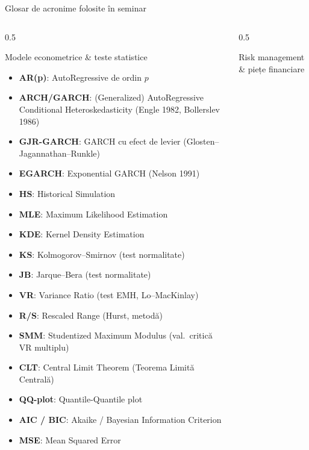 \documentclass[9pt, aspectratio=169, t]{beamer}
\begin{document}
\begin{frame}[shrink=40]{Glosar de acronime folosite în seminar}
\begin{columns}[T]
\begin{column}{0.5\textwidth}
\footnotesize
\begin{block}{Modele econometrice \& teste statistice}
\begin{itemize}\setlength{\itemsep}{1pt}
    \item \textbf{AR(p)}: AutoRegressive de ordin $p$
    \item \textbf{ARCH/GARCH}: (Generalized) AutoRegressive Conditional Heteroskedasticity (Engle 1982, Bollerslev 1986)
    \item \textbf{GJR-GARCH}: GARCH cu efect de levier (Glosten--Jagannathan--Runkle)
    \item \textbf{EGARCH}: Exponential GARCH (Nelson 1991)
    \item \textbf{HS}: Historical Simulation
    \item \textbf{MLE}: Maximum Likelihood Estimation
    \item \textbf{KDE}: Kernel Density Estimation
    \item \textbf{KS}: Kolmogorov--Smirnov (test normalitate)
    \item \textbf{JB}: Jarque--Bera (test normalitate)
    \item \textbf{VR}: Variance Ratio (test EMH, Lo--MacKinlay)
    \item \textbf{R/S}: Rescaled Range (Hurst, metodă)
    \item \textbf{SMM}: Studentized Maximum Modulus (val.\ critică VR multiplu)
    \item \textbf{CLT}: Central Limit Theorem (Teorema Limită Centrală)
    \item \textbf{QQ-plot}: Quantile-Quantile plot
    \item \textbf{AIC / BIC}: Akaike / Bayesian Information Criterion
    \item \textbf{MSE}: Mean Squared Error
\end{itemize}
\end{block}
\end{column}
\begin{column}{0.5\textwidth}
\footnotesize
\begin{block}{Risk management \& piețe financiare}
\begin{itemize}\setlength{\itemsep}{1pt}

\end{itemize}
\end{block}
\end{column}
\end{columns}
\end{frame}
\end{document}
